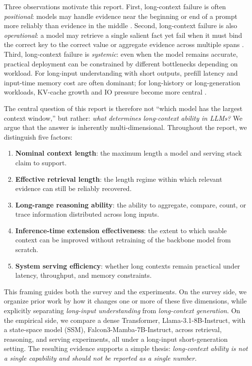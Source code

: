 \documentclass{article}
\begin{document}
Three observations motivate this report. First, long-context failure is often \emph{positional}: models may handle evidence near the beginning or end of a prompt more reliably than evidence in the middle \citep{liu2024lost}. Second, long-context failure is also \emph{operational}: a model may retrieve a single salient fact yet fail when it must bind the correct key to the correct value or aggregate evidence across multiple spans \citep{hsieh2024ruler, kuratov2024babilong}. Third, long-context failure is \emph{systemic}: even when the model remains accurate, practical deployment can be constrained by different bottlenecks depending on workload. For long-input understanding with short outputs, prefill latency and input-time memory cost are often dominant; for long-history or long-generation workloads, KV-cache growth and IO pressure become more central \citep{dao2022flashattention, kwon2023pagedattention, zheng2024sglang}.

The central question of this report is therefore not ``which model has the largest context window,'' but rather: \emph{what determines long-context ability in LLMs?} We argue that the answer is inherently multi-dimensional. Throughout the report, we distinguish five factors:
\begin{enumerate}[leftmargin=1.5em]
  \item \textbf{Nominal context length}: the maximum length a model and serving stack claim to support.
  \item \textbf{Effective retrieval length}: the length regime within which relevant evidence can still be reliably recovered.
  \item \textbf{Long-range reasoning ability}: the ability to aggregate, compare, count, or trace information distributed across long inputs.
  \item \textbf{Inference-time extension effectiveness}: the extent to which usable context can be improved without retraining of the backbone model from scratch.
  \item \textbf{System serving efficiency}: whether long contexts remain practical under latency, throughput, and memory constraints.
\end{enumerate}

This framing guides both the survey and the experiments. On the survey side, we organize prior work by how it changes one or more of these five dimensions, while explicitly separating \emph{long-input understanding} from \emph{long-context generation}. On the empirical side, we compare a dense Transformer, Llama-3.1-8B-Instruct, with a state-space model (SSM), Falcon3-Mamba-7B-Instruct, across retrieval, reasoning, and serving experiments, all under a long-input short-generation setting. The resulting evidence supports a simple thesis: \emph{long-context ability is not a single capability and should not be reported as a single number.}
\end{document}
